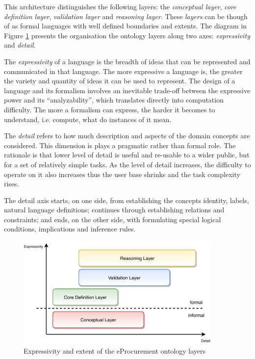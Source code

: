 	This architecture distinguishes the following layers: the \textit{conceptual layer}, \textit{core definition layer}, \textit{validation layer} and \textit{reasoning layer}. These \textit{layers} can be though of as formal languages with well defined boundaries and extents. The diagram in Figure \ref{fig:layers} presents the organisation the ontology layers along two axes: \textit{expressivity} and \textit{detail}. 
	
	The \textit{expressivity} of a language is the breadth of ideas that can be represented and communicated in that language. The more expressive a language is, the greater the variety and quantity of ideas it can be used to represent. The design of a language and its formalism involves an inevitable trade-off between the expressive power and its ``analyzability'', which translates directly into computation difficulty. The more a formalism can express, the harder it becomes to understand, i.e. compute, what do instances of it mean.
	
	The \textit{detail} refers to how much description and aspects of the domain concepts are considered. This dimension is plays a pragmatic rather than formal role. The rationale is that lower level of detail is useful and re-usable to a wider public, but for a set of relatively simple tasks. As the level of detail increases, the difficulty to operate on it also increases thus the user base shrinks and the task complexity rises. 
	
	The detail axis starts, on one side, from establishing the concepts identity, labels, natural language  definitions; continues through establishing relations and constraints; and ends, on the other side, with formulating special logical conditions, implications and inference rules.
	
	\begin{figure}[!ht]
		\centering
		\includegraphics[width=0.9\textwidth]{../img/eProcurement-layers}
		\caption{Expressivity and extent of the eProcurement ontology layers}
		\label{fig:layers}
	\end{figure}
	
